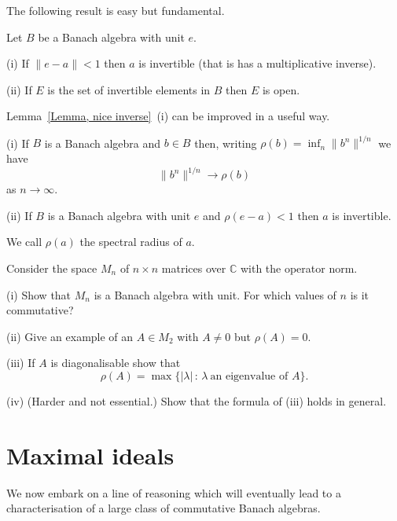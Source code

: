 The following result is easy but fundamental.
\begin{lemma}\label{Lemma, nice inverse}
Let $B$ be a Banach algebra with
unit $e$. 

(i) If $\|e-a\|<1$ then $a$ is invertible (that is
has a multiplicative inverse).

(ii) If $E$ is the set of invertible elements
in $B$ then $E$ is open.
\end{lemma}

Lemma~\ref{Lemma, nice inverse}~(i) can be improved
in a useful way.
\begin{theorem}\label{Theorem, spectral radius}
(i) If $B$ is a Banach algebra and $b\in B$ then,
writing $\rho(b)=\inf_{n}\|b^{n}\|^{1/n}$
we have
\[\|b^{n}\|^{1/n}\rightarrow \rho(b)\]
as $n\rightarrow\infty$.

(ii) If $B$ is a Banach algebra with unit $e$
and $\rho(e-a)<1$ then $a$ is invertible.
\end{theorem}
We call $\rho(a)$
the spectral radius of $a$.

\begin{exercise} Consider the space $M_{n}$
of $n\times n$ matrices over ${\mathbb C}$
with the operator norm.

(i) Show that $M_{n}$ is a Banach algebra with
unit. For which values of $n$ is it commutative?

(ii) Give an example of an $A\in M_{2}$ with
$A\neq 0$ but $\rho(A)=0$.

(iii) If $A$ is diagonalisable show that 
\[\rho(A)=\max\{|\lambda|\,:\,\lambda\ \text{an eigenvalue of $A$}\}.\]

(iv) (Harder and not essential.) Show that the formula
of (iii) holds in general.
\end{exercise}
\section{Maximal ideals} We now embark on a line of reasoning
which will eventually lead to a characterisation of
a large class of commutative Banach algebras.

